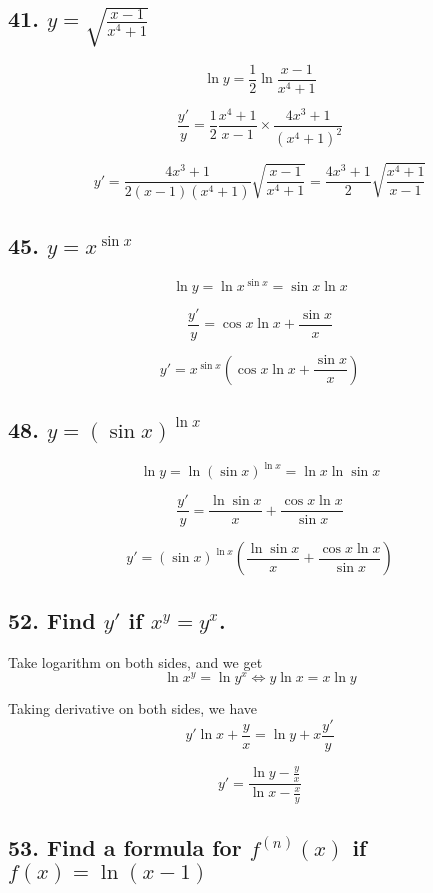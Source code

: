 \documentclass{article}
\begin{document}
    \subsection*{41. $y = \sqrt{\frac{x - 1}{x^4 + 1}}$}

    $$\ln y = \frac 1 2 \ln \frac{x - 1}{x^4 + 1}$$

    $$\frac{y'}{y} = \frac 1 2 \frac{x^4 + 1}{x - 1} \times \frac{4x^3 + 1}{(x^4 + 1)^2}$$

    $$y' = \frac{4x^3 + 1}{2(x - 1)(x^4 + 1)} \sqrt{\frac{x- 1}{x^4 + 1}} = \frac{4x^3 + 1}{2} \sqrt{\frac{x^4 + 1}{x - 1}}$$

    \subsection*{45. $y = x^{\sin x }$}

    $$\ln y = \ln x^{\sin x} = \sin x \ln x$$

    $$\frac{y'}{y} = \cos x \ln x + \frac{\sin x}{x}$$

    $$y' = x^{\sin x}(\cos x \ln x + \frac{\sin x}{x})$$

    \subsection*{48. $y = (\sin x)^{\ln x}$}

    $$\ln y = \ln (\sin x)^{\ln x} = \ln x \ln \sin x$$

    $$\frac{y'}{y} = \frac{\ln \sin x}{x} + \frac{\cos x \ln x}{\sin x}$$

    $$y' = (\sin x)^{\ln x}(\frac{\ln \sin x}{x} + \frac{\cos x \ln x}{\sin x})$$

    \subsection*{52. Find $y'$ if $x^y = y^x$.}

    Take logarithm on both sides, and we get $$\ln x^y = \ln y^x \iff y\ln x = x\ln y$$

    Taking derivative on both sides, we have $$y'\ln x + \frac{y}{x} = \ln y + x\frac{y'}{y}$$

    $$y' = \frac{\ln y - \frac y x}{\ln x - \frac x y}$$

    \subsection*{53. Find a formula for $f^{(n)} (x)$ if $f(x) = \ln(x - 1)$}
\end{document}
